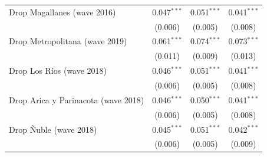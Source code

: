 \begin{table}[htbp]
{{\begin{tabular}{lccc}
      Drop Magallanes (wave 2016) & 0.047$^{***}$ & 0.051$^{***}$ & 0.041$^{***}$\\
       & (0.006) & (0.005) & (0.008)\\
      Drop Metropolitana (wave 2019) & 0.061$^{***}$ & 0.074$^{***}$ & 0.073$^{***}$\\
       & (0.011) & (0.009) & (0.013)\\
      Drop Los R\'ios (wave 2018) & 0.046$^{***}$ & 0.051$^{***}$ & 0.041$^{***}$\\
       & (0.006) & (0.005) & (0.008)\\
      Drop Arica y Parinacota (wave 2018) & 0.046$^{***}$ & 0.050$^{***}$ & 0.041$^{***}$\\
       & (0.006) & (0.005) & (0.008)\\
      Drop \~Nuble (wave 2018) & 0.045$^{***}$ & 0.051$^{***}$ & 0.042$^{***}$\\
       & (0.006) & (0.005) & (0.009)\\
      \bottomrule
   \end{tabular}}}
\end{table}

